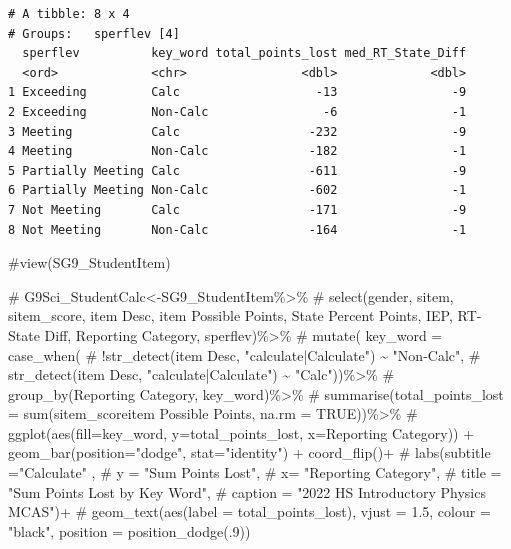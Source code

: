 \documentclass[
  letterpaper,
  DIV=11,
  numbers=noendperiod]{scrartcl}
\newenvironment{Shaded}{\begin{snugshade}}{\end{snugshade}}
\newcommand{\CommentTok}[1]{\textcolor[rgb]{0.37,0.37,0.37}{#1}}
\begin{document}
\begin{verbatim}
# A tibble: 8 x 4
# Groups:   sperflev [4]
  sperflev          key_word total_points_lost med_RT_State_Diff
  <ord>             <chr>                <dbl>             <dbl>
1 Exceeding         Calc                   -13                -9
2 Exceeding         Non-Calc                -6                -1
3 Meeting           Calc                  -232                -9
4 Meeting           Non-Calc              -182                -1
5 Partially Meeting Calc                  -611                -9
6 Partially Meeting Non-Calc              -602                -1
7 Not Meeting       Calc                  -171                -9
8 Not Meeting       Non-Calc              -164                -1
\end{verbatim}

\begin{Shaded}
\begin{Highlighting}[]
\CommentTok{\#view(SG9\_StudentItem)}


\CommentTok{\# G9Sci\_StudentCalc\textless{}{-}SG9\_StudentItem\%\textgreater{}\%}
\CommentTok{\#   select(gender, sitem, sitem\_score, \textasciigrave{}item Desc\textasciigrave{}, \textasciigrave{}item Possible Points\textasciigrave{}, \textasciigrave{}State Percent Points\textasciigrave{}, IEP, \textasciigrave{}RT{-}State Diff\textasciigrave{}, \textasciigrave{}Reporting Category\textasciigrave{}, \textasciigrave{}sperflev\textasciigrave{})\%\textgreater{}\%}
\CommentTok{\#   mutate( key\_word = case\_when(}
\CommentTok{\#      !str\_detect(\textasciigrave{}item Desc\textasciigrave{}, "calculate|Calculate") \textasciitilde{} "Non{-}Calc",}
\CommentTok{\#      str\_detect(\textasciigrave{}item Desc\textasciigrave{}, "calculate|Calculate") \textasciitilde{} "Calc"))\%\textgreater{}\%}
\CommentTok{\#   group\_by(\textasciigrave{}Reporting Category\textasciigrave{}, \textasciigrave{}key\_word\textasciigrave{})\%\textgreater{}\%}
\CommentTok{\#   summarise(total\_points\_lost = sum(\textasciigrave{}sitem\_score\textasciigrave{}{-}\textasciigrave{}item Possible Points\textasciigrave{}, na.rm = TRUE))\%\textgreater{}\%}
\CommentTok{\#  ggplot(aes(fill=\textasciigrave{}key\_word\textasciigrave{}, y=total\_points\_lost, x=\textasciigrave{}Reporting Category\textasciigrave{})) + geom\_bar(position="dodge", stat="identity") + coord\_flip()+}
\CommentTok{\#    labs(subtitle ="Calculate" ,}
\CommentTok{\#        y = "Sum Points Lost",}
\CommentTok{\#        x= "Reporting Category",}
\CommentTok{\#        title = "Sum Points Lost by Key Word",}
\CommentTok{\#       caption = "2022 HS Introductory Physics MCAS")+}
\CommentTok{\#    geom\_text(aes(label = \textasciigrave{}total\_points\_lost\textasciigrave{}), vjust = 1.5, colour = "black", position = position\_dodge(.9))}



\end{Highlighting}
\end{Shaded}
\end{document}
